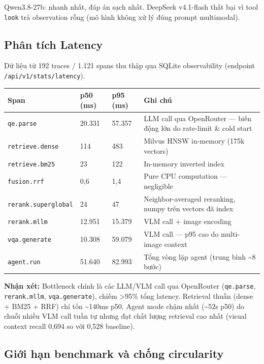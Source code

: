 \documentclass[12pt,a4paper,onecolumn]{article}
\begin{document}
Qwen3.8-27b: nhanh nhất, đáp án sạch nhất. DeepSeek v4.1-flash thất bại vì tool \texttt{look} trả observation rỗng (mô hình không xử lý đúng prompt multimodal).

\subsection{Phân tích Latency}

Dữ liệu từ 192 traces / 1.121 spans thu thập qua SQLite observability (endpoint \texttt{/api/v1/stats/latency}).

\begin{center}
\begin{tabular}{l l l l}
\toprule
Span & p50 (ms) & p95 (ms) & Ghi chú \\
\midrule
\texttt{qe.parse} & 20.331 & 57.357 & LLM call qua OpenRouter — biến động lớn do rate-limit \& cold start \\
\texttt{retrieve.dense} & 114 & 483 & Milvus HNSW in-memory (175k vectors) \\
\texttt{retrieve.bm25} & 23 & 122 & In-memory inverted index \\
\texttt{fusion.rrf} & 0,6 & 1,4 & Pure CPU computation — negligible \\
\texttt{rerank.superglobal} & 24 & 47 & Neighbor-averaged reranking, numpy trên vectors đã index \\
\texttt{rerank.mllm} & 12.951 & 15.379 & VLM call + image encoding \\
\texttt{vqa.generate} & 10.308 & 59.079 & VLM call — p95 cao do multi-image context \\
\texttt{agent.run} & 51.640 & 82.993 & Tổng vòng lặp agent (trung bình \textasciitilde{}8 bước) \\
\bottomrule
\end{tabular}
\end{center}


\textbf{Nhận xét:} Bottleneck chính là các LLM/VLM call qua OpenRouter (\texttt{qe.parse}, \texttt{rerank.mllm}, \texttt{vqa.generate}), chiếm >95\% tổng latency. Retrieval thuần (dense + BM25 + RRF) chỉ tốn \textasciitilde{}140ms p50. Agent mode chậm nhất (\textasciitilde{}52s p50) do chuỗi nhiều VLM call tuần tự nhưng đạt chất lượng retrieval cao nhất (visual context recall 0,694 so với 0,528 baseline).

\subsection{Giới hạn benchmark và chống circularity}
\end{document}
